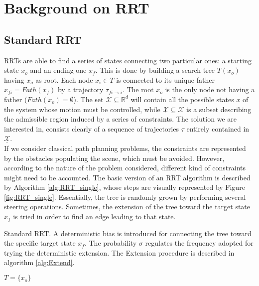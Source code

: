 \section{Background on RRT}

\subsection{Standard RRT}
\label{sec:RRT_single}

RRTs are able to find a series of states connecting two particular ones: a starting state $x_o$ and an ending one $x_f$. This is done by building a search tree $T(x_o)$ having $x_o$ as root. Each node $x_i \in T$ is connected to its unique father $x_{fi}=Fath(x_f)$ by a trajectory $\tau_{fi \rightarrow i}$.
The root $x_o$ is the only node not having a father ($Fath(x_o)=\emptyset$). 
The set $\mathcal{X} \subseteq \mathbb{R}^{d} $ will contain all the possible states $x$ of the system whose motion must be controlled, while $\underline{\mathcal{X}} \subseteq \mathcal{X}$ is a subset describing the admissible region induced by a series of constraints. 
The solution we are interested in, consists clearly of a sequence of trajectories $\tau$ entirely contained in $\underline{\mathcal{X}}$.
\\
If we consider classical path planning problems, the constraints are represented by the obstacles populating the scene, which must be avoided.
However, according to the nature of the problem considered, different kind of constraints might need to be accounted.
The basic version of an RRT algorithm is described by Algorithm \ref{alg:RRT_single}, whose steps are visually represented by Figure \ref{fig:RRT_single}.
Essentially, the tree is randomly grown by performing several steering operations. Sometimes, the extension of the tree toward the target state $x_f$ is tried in order to find an edge leading to that state.

\begin{algorithm}
 \caption{Standard RRT. A deterministic bias is introduced for connecting the tree toward the specific target state $x_f$.
 The probability $\sigma$ regulates the frequency adopted for trying the deterministic extension. The Extension procedure is described in algorithm \ref{alg:Extend}.
 \label{alg:RRT_single}}
 $T= \lbrace x_o \rbrace$\; 
 \end{algorithm}

